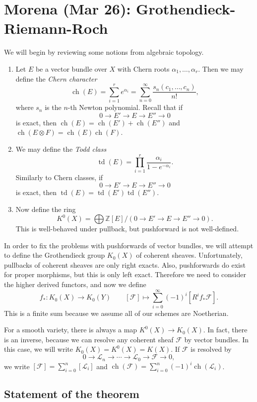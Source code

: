\documentclass[leqno, openany]{memoir}
\theoremstyle{definition}
\theoremstyle{remark}
\theoremstyle{plain}
\theoremstyle{definition}
\theoremstyle{remark}
\newcommand{\Z}{\mathbb{Z}}
\newcommand{\mc}[1]{\mathcal{#1}}
\DeclareMathOperator{\ch}{ch}
\DeclareMathOperator{\td}{td}
\begin{document}
\chapter{Morena (Mar 26): Grothendieck-Riemann-Roch}%
\label{cha:morena_mar_26_grothendieck_riemann_roch}

We will begin by reviewing some notions from algebraic topology. 
\begin{enumerate}
    \item Let $E$ be a vector bundle over $X$ with Chern roots $\alpha_1, \ldots, \alpha_r$. Then we may define the \textit{Chern character} 
        \[ \ch(E) = \sum_{i=1}^r e^{\alpha_i} = \sum_{n=0}^{\infty} \frac{s_n(c_1, \ldots, c_n)}{n!}, \]
        where $s_n$ is the $n$-th Newton polynomial. Recall that if
        \[ 0 \to E' \to E \to E'' \to 0 \]
        is exact, then $\ch(E) = \ch(E') + \ch(E'')$ and $\ch(E \otimes F) = \ch(E) \ch(F)$.
    \item We may define the \textit{Todd class}
        \[ \td(E) = \prod_{i=1}^r \frac{\alpha_i}{1-e^{-\alpha_i}}. \]
        Similarly to Chern classes, if 
        \[ 0 \to E' \to E \to E'' \to 0 \]
        is exact, then $\td(E) = \td(E') \td(E'')$.
    \item Now define the ring
        \[ K^0(X) = \bigoplus \Z[E] / (0 \to E' \to E \to E'' \to 0). \]
        This is well-behaved under pullback, but pushforward is not well-defined. 
\end{enumerate}

In order to fix the problems with pushforwards of vector bundles, we will attempt to define the Grothendieck group $K_0(X)$ of coherent sheaves. Unfortunately, pullbacks of coherent sheaves are only right exacts. Also, pushforwards do exist for proper morphisms, but this is only left exact. Therefore we need to consider the higher derived functors, and now we define
\[ f_* \colon K_0(X) \to K_0(Y) \qquad [\mc{F}] \mapsto \sum_{i=0}^{\infty} {(-1)}^i [R^i f_* \mc{F}]. \]
This is a finite sum because we assume all of our schemes are Noetherian.

For a smooth variety, there is always a map $K^0(X) \to K_0(X)$. In fact, there is an inverse, because we can resolve any coherent sheaf $\mc{F}$ by vector bundles. In this case, we will write $K_0(X) = K^0(X) = K(X)$. If $\mc{F}$ is resolved by
\[ 0 \to \mc{L}_n \to \cdots \to \mc{L}_0 \to \mc{F} \to 0, \]
we write $[\mc{F}] = \sum_{i=0}^n [\mc{L}_i]$ and $\ch(\mc{F}) = \sum_{i=0}^n {(-1)}^i \ch(\mc{L}_i)$.

\section{Statement of the theorem}%
\label{sec:statement_of_the_theorem}
\end{document}
